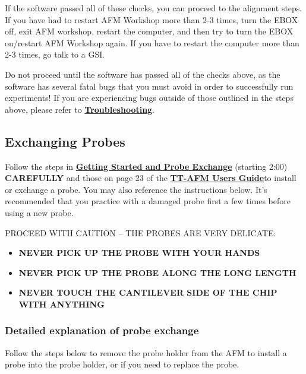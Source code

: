 \documentclass{../lab}
\newcommand{\afmuserguide}{\href{https://berkeley-physics111b.github.io/assets/pdf/oldwebsitestructure/AFMImages/TT_AFM\%20User-Guide-V2.2-600DPI.pdf}{\textbf{TT-AFM Users Guide}}}
\begin{document}
If the software passed all of these checks, you can proceed to the alignment steps. If you have had to restart AFM Workshop more than 2-3 times, turn the EBOX off, exit AFM workshop, restart the computer, and then try to turn the EBOX on/restart AFM Workshop again. If you have to restart the computer more than 2-3 times, go talk to a GSI.

Do not proceed until the software has passed all of the checks above, as the software has several fatal bugs that you must avoid in order to successfully run experiments! If you are experiencing bugs outside of those outlined in the steps above, please refer to \hyperref[sec:Troubleshooting]{\textbf{Troubleshooting}}.

\subsection{Exchanging Probes} 
\label{subsec:exchange_probes}

Follow the steps in \href{https://berkeley-physics111b.github.io/assets/pdf/oldwebsitestructure/gettingstarted\_final2.mp4}{\textbf{Getting Started and Probe Exchange}} (starting 2:00) \textbf{CAREFULLY} and those on page 23 of the \afmuserguide to install or exchange a probe. You may also reference the instructions below. It's recommended that you practice with a damaged probe first a few times before using a new probe.

PROCEED WITH CAUTION -- THE PROBES ARE VERY DELICATE:
\begin{itemize}
    \item \textbf{NEVER PICK UP THE PROBE WITH YOUR HANDS}

    \item \textbf{NEVER PICK UP THE PROBE ALONG THE LONG LENGTH}

    \item \textbf{NEVER TOUCH THE CANTILEVER SIDE OF THE CHIP WITH ANYTHING} %
\end{itemize}

\subsubsection{Detailed explanation of probe exchange}

Follow the steps below to remove the probe holder from the AFM to install a probe into the probe holder, or if you need to replace the probe.
\end{document}
